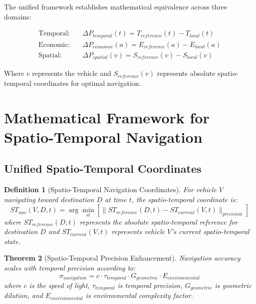 \documentclass[12pt,a4paper]{article}
\newtheorem{theorem}{Theorem}[section]
\newtheorem{definition}[theorem]{Definition}
\begin{document}
The unified framework establishes mathematical equivalence across three domains:

\begin{align}
\text{Temporal:} \quad &\Delta P_{temporal}(t) = T_{reference}(t) - T_{local}(t) \\
\text{Economic:} \quad &\Delta P_{economic}(a) = E_{reference}(a) - E_{local}(a) \\
\text{Spatial:} \quad &\Delta P_{spatial}(v) = S_{reference}(v) - S_{local}(v)
\end{align}

Where $v$ represents the vehicle and $S_{reference}(v)$ represents absolute spatio-temporal coordinates for optimal navigation.

\section{Mathematical Framework for Spatio-Temporal Navigation}

\subsection{Unified Spatio-Temporal Coordinates}

\begin{definition}[Spatio-Temporal Navigation Coordinates]
For vehicle $V$ navigating toward destination $D$ at time $t$, the spatio-temporal coordinate is:
\begin{equation}
ST_{nav}(V,D,t) = \arg\min_{st} \left[ \|ST_{reference}(D,t) - ST_{current}(V,t)\|_{precision} \right]
\end{equation}
where $ST_{reference}(D,t)$ represents the absolute spatio-temporal reference for destination $D$ and $ST_{current}(V,t)$ represents vehicle $V$'s current spatio-temporal state.
\end{definition}

\begin{theorem}[Spatio-Temporal Precision Enhancement]
Navigation accuracy scales with temporal precision according to:
\begin{equation}
\sigma_{navigation} = c \cdot \tau_{temporal} \cdot G_{geometric} \cdot E_{environmental}
\end{equation}
where $c$ is the speed of light, $\tau_{temporal}$ is temporal precision, $G_{geometric}$ is geometric dilution, and $E_{environmental}$ is environmental complexity factor.
\end{theorem}
\end{document}
